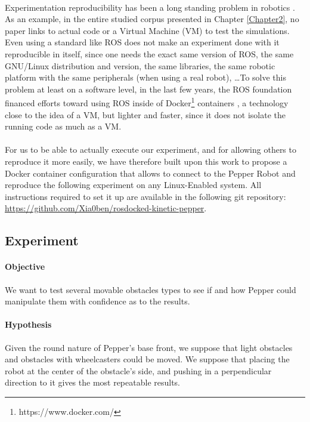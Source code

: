 \paragraph{} Experimentation reproducibility has been a long standing problem in robotics \parencite{guglielmelli_research_2015, bonsignorio_toward_2015}. As an example, in the entire studied corpus presented in Chapter \ref{Chapter2}, no paper links to actual code or a Virtual Machine (VM) to test the simulations. Even using a standard like ROS does not make an experiment done with it reproducible in itself, since one needs the exact same version of ROS, the same GNU/Linux distribution and version, the same libraries, the same robotic platform with the same peripherals (when using a real robot), \dots To solve this problem at least on a software level, in the last few years, the ROS foundation financed efforts toward using ROS inside of Docker\footnote{https://www.docker.com/} containers \parencite{white_ros_2017}, a technology close to the idea of a VM, but lighter and faster, since it does not isolate the running code as much as a VM.

\paragraph{} For us to be able to actually execute our experiment, and for allowing others to reproduce it more easily, we have therefore built upon this work to propose a Docker container configuration that allows to connect to the Pepper Robot and reproduce the following experiment on any Linux-Enabled system. All instructions required to set it up are available in the following git repository: \\ \url{https://github.com/Xia0ben/rosdocked-kinetic-pepper}.

\subsection{Experiment}

\paragraph{Objective} We want to test several movable obstacles types to see if and how Pepper could manipulate them with confidence as to the results.

\paragraph{Hypothesis} Given the round nature of Pepper's base front, we suppose that light obstacles and obstacles with wheelcasters could be moved. We suppose that placing the robot at the center of the obstacle's side, and pushing in a perpendicular direction to it gives the most repeatable results.

